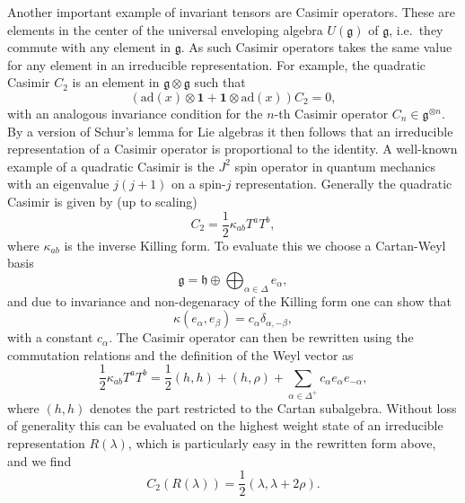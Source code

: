 Another important example of invariant tensors are Casimir operators. These are elements in the center of the universal enveloping algebra $U(\mathfrak{g})$ of $\mathfrak{g}$, i.e.\ they commute with any element in $\mathfrak{g}$. As such Casimir operators takes the same value for any element in an irreducible representation. For example, the quadratic Casimir $C_2$ is an element in $\mathfrak{g}\otimes\mathfrak{g}$ such that 
\begin{equation}
    \left(\text{ad}(x)\otimes\mathbf{1}+\mathbf{1}\otimes\text{ad}(x)\right)C_2 = 0,
\end{equation}
with an analogous invariance condition for the $n$-th Casimir operator $C_n\in\mathfrak{g}^{\otimes n}$. By a version of Schur's lemma for Lie algebras it then follows that an irreducible representation of a Casimir operator is proportional to the identity. A well-known example of a quadratic Casimir is the $J^2$ spin operator in quantum mechanics with an eigenvalue $j(j+1)$ on a spin-$j$ representation. Generally the quadratic Casimir is given by (up to scaling)
\begin{equation}
    C_2 = \frac{1}{2}\kappa_{ab}T^aT^b,
\end{equation}
where $\kappa_{ab}$ is the inverse Killing form. To evaluate this we choose a Cartan-Weyl basis 
\begin{equation}
    \mathfrak{g} = \mathfrak{h} \oplus\bigoplus_{\alpha\in\Delta} e_\alpha, 
\end{equation}
and due to invariance and non-degenaracy of the Killing form one can show that
\begin{equation}
    \kappa(e_\alpha,e_\beta) = c_\alpha\delta_{\alpha,-\beta},
\end{equation}
with a constant $c_\alpha$. The Casimir operator can then be rewritten using the commutation relations and the definition of the Weyl vector as 
\begin{equation}\label{eq:DefCasimir}
    \frac{1}{2}\kappa_{ab}T^aT^b = \frac{1}{2}(h,h)+(h,\rho)+\sum_{\alpha\in\Delta^+}c_\alpha e_{\alpha}e_{-\alpha},
\end{equation}
where $(h,h)$ denotes the part restricted to the Cartan subalgebra. Without loss of generality this can be evaluated on the highest weight state of an irreducible representation $R(\lambda)$, which is particularly easy in the rewritten form above, and we find
\begin{equation}\label{eq:Casimir}
    C_2(R(\lambda)) = \frac{1}{2}(\lambda,\lambda+2\rho).
\end{equation}

